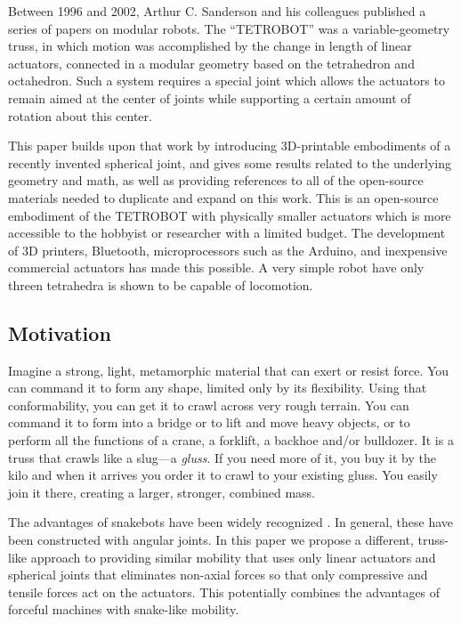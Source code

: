 \documentclass[11pt]{article}
\begin{document}
Between 1996 and 2002, Arthur C. Sanderson and his colleagues published a series of
papers\cite{sanderson1996modular,lee2002dynamic,lee1999dynamics} on modular robots.
The ``TETROBOT'' was a variable-geometry truss, in which motion was accomplished by the change
in length of linear actuators, connected in a modular geometry based on the tetrahedron and octahedron.
Such a system
requires a special joint which allows the actuators to remain aimed at the center of joints while supporting
a certain amount of rotation about this center.

This paper builds upon that work by 
introducing 3D-printable embodiments of
a recently invented spherical joint\cite{song2003spherical}, 
and gives some results related to the underlying geometry and math, as well as providing
references to all of the open-source materials needed to duplicate and expand on this work. This is an
open-source embodiment of the TETROBOT with physically smaller actuators which is more accessible to the
hobbyist or researcher with a limited budget.  The development of 3D printers, Bluetooth, microprocessors
such as the Arduino, and inexpensive commercial actuators has made this possible.
A very simple robot have only threen tetrahedra is shown to be capable of locomotion.

\subsection{Motivation}

Imagine a strong, light, metamorphic material that can exert or resist force.
You can command it to form any shape, limited only by its flexibility.
Using that conformability, you can get it to crawl across very rough terrain.
You can command it to form into a bridge or to lift and move heavy objects,
or to perform all the functions of a crane, a forklift, a backhoe and/or bulldozer.
It is a truss that crawls like a slug---a \emph{gluss}.
If you need more of it, you buy it by the kilo and when it arrives you order it
to crawl to your existing gluss. You easily join it there, creating a
larger, stronger, combined mass.

The advantages of snakebots have been widely recognized \cite{liljebäck2012snake}.
In general, these have been constructed
with angular joints. In this paper we propose a different, truss-like approach to providing similar
mobility that uses only linear actuators and spherical joints that eliminates non-axial forces so that only
compressive and tensile forces act on the actuators.
This potentially combines the advantages of forceful machines with snake-like mobility.
\end{document}
